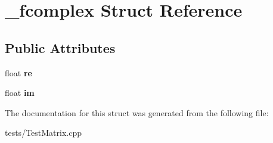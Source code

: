 \hypertarget{struct__fcomplex}{}\section{\+\_\+fcomplex Struct Reference}
\label{struct__fcomplex}
\subsection*{Public Attributes}
\begin{DoxyCompactItemize}
\item 
float {\bfseries re}\hypertarget{struct__fcomplex_a2a0b3a27cdca39b44baa7d0f40738623}{}\label{struct__fcomplex_a2a0b3a27cdca39b44baa7d0f40738623}

\item 
float {\bfseries im}\hypertarget{struct__fcomplex_a703839cffd5c774188a01627a71b4a20}{}\label{struct__fcomplex_a703839cffd5c774188a01627a71b4a20}

\end{DoxyCompactItemize}


The documentation for this struct was generated from the following file\+:\begin{DoxyCompactItemize}
\item 
tests/Test\+Matrix.\+cpp\end{DoxyCompactItemize}
